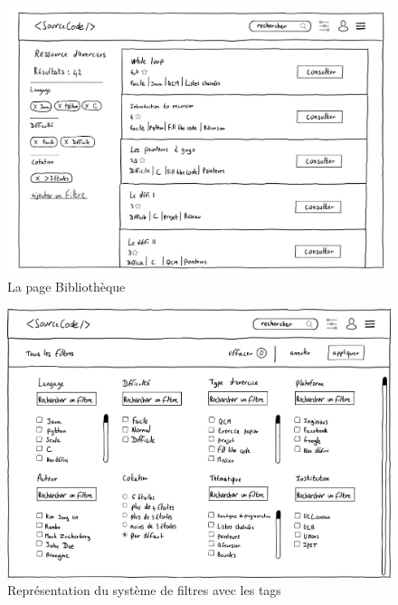 \begin{figure}[H]
    \includegraphics[width=\textwidth,height=\textheight,keepaspectratio]{images/library.JPG}
    \centering
    \caption{La page Bibliothèque}
\end{figure}

\begin{figure}[H]
    \includegraphics[width=\textwidth,height=0.4\textheight,keepaspectratio]{images/filters.JPG}
    \centering
    \caption{Représentation du système de filtres avec les \glspl{tag}}
\end{figure}

